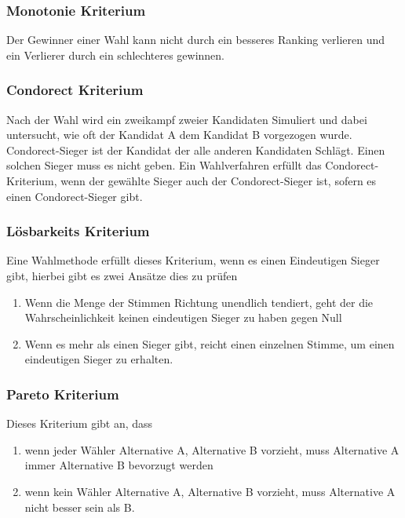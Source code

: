 \subsubsection{Monotonie Kriterium} 
\label{sec:monotoniekriterium}
Der Gewinner einer Wahl kann nicht durch ein besseres Ranking verlieren und ein Verlierer durch ein schlechteres gewinnen. \cite{Woodall1996}

\subsubsection{Condorect Kriterium} 
\label{sec:condorectKriterium}
Nach der Wahl wird ein zweikampf zweier Kandidaten Simuliert und dabei untersucht, wie oft der Kandidat A dem Kandidat B vorgezogen wurde. Condorect-Sieger ist der Kandidat der alle anderen Kandidaten Schlägt. Einen solchen Sieger muss es nicht geben. Ein Wahlverfahren erfüllt das Condorect-Kriterium, wenn der gewählte Sieger auch der Condorect-Sieger ist, sofern es einen Condorect-Sieger gibt. \cite{Johnson2005}

\subsubsection{Lösbarkeits Kriterium} 
\label{sec:loesbarkeitsKriterium}
Eine Wahlmethode erfüllt dieses Kriterium, wenn es einen Eindeutigen Sieger gibt, hierbei gibt es zwei Ansätze dies zu prüfen \citet{Schulze2017}
\begin{enumerate}
\item Wenn die Menge der Stimmen Richtung unendlich tendiert, geht der die Wahrscheinlichkeit keinen eindeutigen Sieger zu haben gegen Null 
\item Wenn es mehr als einen Sieger gibt, reicht einen einzelnen Stimme, um einen eindeutigen Sieger zu erhalten.
\end{enumerate}

\subsubsection{Pareto Kriterium} 
\label{sec:paretoKriterium}
Dieses Kriterium gibt an, dass
\begin{enumerate}
\item wenn jeder Wähler Alternative A, Alternative B vorzieht, muss Alternative A immer Alternative B bevorzugt werden
\item wenn kein Wähler Alternative A, Alternative B vorzieht, muss Alternative A nicht besser sein als B. \citet{Schulze2017}
\end{enumerate}

